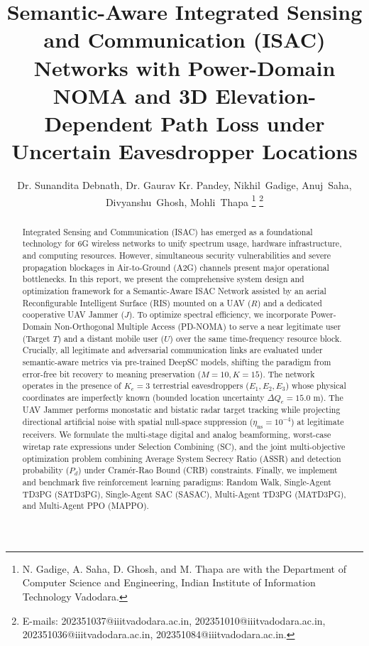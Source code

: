 \documentclass[journal,onecolumn]{IEEEtran}
\begin{document}
\title{Semantic-Aware Integrated Sensing and Communication (ISAC) Networks with Power-Domain NOMA and 3D Elevation-Dependent Path Loss under Uncertain Eavesdropper Locations}

\author{
Dr. Sunandita Debnath, Dr. Gaurav Kr. Pandey,
Nikhil~Gadige,
Anuj~Saha,
Divyanshu~Ghosh,
Mohli~Thapa%
\thanks{N. Gadige, A. Saha, D. Ghosh, and M. Thapa are with the Department of Computer Science and Engineering, Indian Institute of Information Technology Vadodara.}%
\thanks{E-mails: 202351037@iiitvadodara.ac.in, 202351010@iiitvadodara.ac.in, 202351036@iiitvadodara.ac.in, 202351084@iiitvadodara.ac.in.}
}

\maketitle

\begin{abstract}
Integrated Sensing and Communication (ISAC) has emerged as a foundational technology for 6G wireless networks to unify spectrum usage, hardware infrastructure, and computing resources. However, simultaneous security vulnerabilities and severe propagation blockages in Air-to-Ground (A2G) channels present major operational bottlenecks. In this report, we present the comprehensive system design and optimization framework for a Semantic-Aware ISAC Network assisted by an aerial Reconfigurable Intelligent Surface (RIS) mounted on a UAV ($R$) and a dedicated cooperative UAV Jammer ($J$). To optimize spectral efficiency, we incorporate Power-Domain Non-Orthogonal Multiple Access (PD-NOMA) to serve a near legitimate user (Target $T$) and a distant mobile user ($U$) over the same time-frequency resource block. Crucially, all legitimate and adversarial communication links are evaluated under semantic-aware metrics via pre-trained DeepSC models, shifting the paradigm from error-free bit recovery to meaning preservation ($M=10, K=15$). The network operates in the presence of $K_e = 3$ terrestrial eavesdroppers ($E_1, E_2, E_3$) whose physical coordinates are imperfectly known (bounded location uncertainty $\Delta Q_e = 15.0\text{ m}$). The UAV Jammer performs monostatic and bistatic radar target tracking while projecting directional artificial noise with spatial null-space suppression ($\eta_{\text{ns}} = 10^{-4}$) at legitimate receivers. We formulate the multi-stage digital and analog beamforming, worst-case wiretap rate expressions under Selection Combining (SC), and the joint multi-objective optimization problem combining Average System Secrecy Ratio (ASSR) and detection probability ($P_d$) under Cram\'{e}r-Rao Bound (CRB) constraints. Finally, we implement and benchmark five reinforcement learning paradigms: Random Walk, Single-Agent TD3PG (SATD3PG), Single-Agent SAC (SASAC), Multi-Agent TD3PG (MATD3PG), and Multi-Agent PPO (MAPPO).
\end{abstract}
\end{document}
